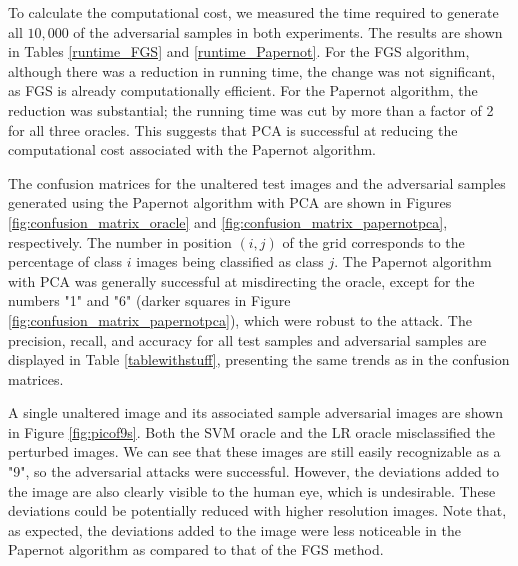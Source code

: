 \indent To calculate the computational cost, we measured the time required to generate all $10,000$ of the adversarial samples in both experiments. The results are shown in Tables \ref{runtime_FGS} and \ref{runtime_Papernot}. For the FGS algorithm, although there was a reduction in running time, the change was not significant, as FGS is already computationally efficient. For the Papernot algorithm, the reduction was substantial; the running time was cut by more than a factor of 2 for all three oracles. This suggests that PCA is successful at reducing the computational cost associated with the Papernot algorithm.

\indent The confusion matrices for the unaltered test images and the adversarial samples generated using the Papernot algorithm with PCA are shown in Figures \ref{fig:confusion_matrix_oracle} and \ref{fig:confusion_matrix_papernotpca}, respectively. The number in position $(i, j)$ of the grid corresponds to the percentage of class $i$ images being classified as class $j$. The Papernot algorithm with PCA was generally successful at misdirecting the oracle, except for the numbers "1" and "6" (darker squares in Figure \ref{fig:confusion_matrix_papernotpca}), which were robust to the attack. The precision, recall, and accuracy for all test samples and adversarial samples are displayed in Table \ref{tablewithstuff}, presenting the same trends as in the confusion matrices.

\indent A single unaltered image and its associated sample adversarial images are shown in Figure \ref{fig:picof9s}. Both the SVM oracle and the LR oracle misclassified the perturbed images. We can see that these images are still easily recognizable as a "9", so the adversarial attacks were successful. However, the deviations added to the image are also clearly visible to the human eye, which is undesirable. These deviations could be potentially reduced with higher resolution images. Note that, as expected, the deviations added to the image were less noticeable in the Papernot algorithm as compared to that of the FGS method. 



